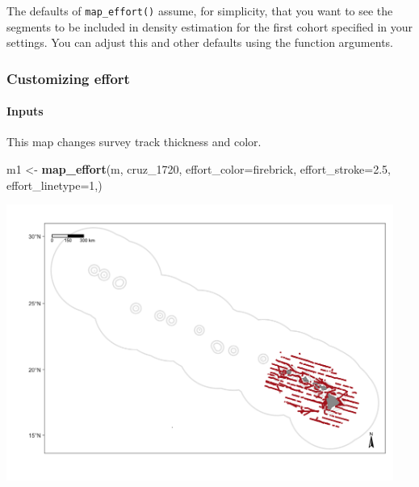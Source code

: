 \documentclass[
]{book}
\newenvironment{Shaded}{\begin{snugshade}}{\end{snugshade}}
\newcommand{\AttributeTok}[1]{\textcolor[rgb]{0.13,0.29,0.53}{#1}}
\newcommand{\DecValTok}[1]{\textcolor[rgb]{0.00,0.00,0.81}{#1}}
\newcommand{\FloatTok}[1]{\textcolor[rgb]{0.00,0.00,0.81}{#1}}
\newcommand{\FunctionTok}[1]{\textcolor[rgb]{0.13,0.29,0.53}{\textbf{#1}}}
\newcommand{\NormalTok}[1]{#1}
\newcommand{\OtherTok}[1]{\textcolor[rgb]{0.56,0.35,0.01}{#1}}
\newcommand{\StringTok}[1]{\textcolor[rgb]{0.31,0.60,0.02}{#1}}
\begin{document}
The defaults of \texttt{map\_effort()} assume, for simplicity, that you want to see the segments to be included in density estimation for the first cohort specified in your settings. You can adjust this and other defaults using the function arguments.

\hypertarget{customizing-effort}{%
\subsubsection*{Customizing effort}\label{customizing-effort}}

\hypertarget{inputs}{%
\paragraph*{Inputs}\label{inputs}}

This map changes survey track thickness and color.

\begin{Shaded}
\begin{Highlighting}[]
\NormalTok{m1 }\OtherTok{\textless{}{-}} \FunctionTok{map\_effort}\NormalTok{(m, }
\NormalTok{                cruz\_1720,}
                \AttributeTok{effort\_color=}\StringTok{\textquotesingle{}firebrick\textquotesingle{}}\NormalTok{,}
                \AttributeTok{effort\_stroke=}\FloatTok{2.5}\NormalTok{,}
                \AttributeTok{effort\_linetype=}\DecValTok{1}\NormalTok{,)}
\end{Highlighting}
\end{Shaded}

\includegraphics[width=0.95\textwidth,height=\textheight]{img/map_tracks2.png}
\end{document}
